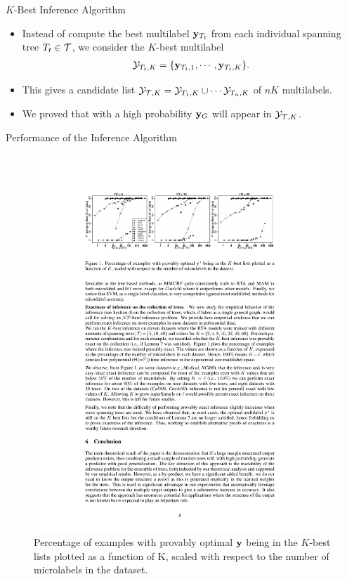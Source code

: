 \documentclass[first=dgreen,second=purple,logo=yellowexc]{aaltoslides}
\begin{document}
%
\begin{frame}{$K$-Best Inference Algorithm}
	\begin{itemize}
		\item Instead of compute the best multilabel $\mathbf {y}_{T_t}$ from each individual spanning tree $T_t\in\mathcal{T}$, we consider the $K$-best multilabel 
		\begin{align*}
			\mathcal{Y}_{T_t,K} = \{\mathbf {y}_{T_t,1},\cdots,\mathbf {y}_{T_t,K}\}.
		\end{align*}
		\item This gives a candidate list $\mathcal{Y}_{\mathcal{T},K}=\mathcal{Y}_{T_1,K}\cup\cdots\mathcal{Y}_{T_n,K}$ of $nK$ multilabels.
		\item We proved that with a high probability $\mathbf {y}_G$ will appear in $\mathcal{Y}_{\mathcal{T},K}$.
	\end{itemize}
\end{frame}



%
\begin{frame}{Performance of the Inference Algorithm}
	\begin{figure}
		\begin{center}
			\includegraphics[width=11cm]{./result_plot.pdf}
			\caption{Percentage of examples with provably optimal $\mathbf {y}$ being in the $K$-best lists plotted as a function of K, scaled with respect to the number of microlabels in the dataset.}
		\end{center}
	\end{figure}
\end{frame}
\end{document}
